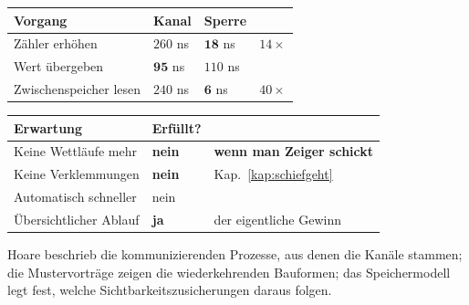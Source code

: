 \begin{aufgabe}
\begin{center}
\renewcommand{\arraystretch}{1.45}
\begin{tabular}{@{}P{3.4cm}P{2.0cm}P{2.0cm}P{1.6cm}@{}}
\toprule
\textbf{Vorgang} & \textbf{Kanal} & \textbf{Sperre} & \\
\midrule
Zähler erhöhen & $260$ ns & $\mathbf{18}$ ns & $14\times$\\
Wert übergeben & $\mathbf{95}$ ns & $110$ ns & \\
Zwischenspeicher lesen & $240$ ns & $\mathbf{6}$ ns & $40\times$\\
\bottomrule
\end{tabular}
\end{center}

\begin{center}
\end{center}

\begin{warnung}
\begin{center}
\renewcommand{\arraystretch}{1.5}
\begin{tabular}{@{}P{3.0cm}P{2.2cm}P{2.8cm}@{}}
\toprule
\textbf{Erwartung} & \textbf{Erfüllt?} & \\
\midrule
Keine Wettläufe mehr & \textcolor{akzent}{\textbf{nein}} & \textbf{wenn man Zeiger schickt}\\
Keine Verklemmungen & \textcolor{akzent}{\textbf{nein}} & \textcolor{akzent}{Kap.~\ref{kap:schiefgeht}}\\
Automatisch schneller & \textcolor{akzent}{nein} & \\
Übersichtlicher Ablauf & \textcolor{gruen}{\textbf{ja}} & \textcolor{gruen}{der eigentliche Gewinn}\\
\bottomrule
\end{tabular}
\end{center}

\begin{center}
\begin{minipage}{0.88\textwidth}
\end{minipage}
\end{center}
\end{warnung}
\end{aufgabe}
\vspace{-4pt}
\noindent Hoare beschrieb die kommunizierenden Prozesse, aus denen die Kanäle stammen; die Mus\-ter\-vor\-trä\-ge zeigen die wiederkehrenden Bau\-for\-men; das Speichermodell legt fest, welche Sicht\-bar\-keits\-zu\-si\-che\-run\-gen daraus folgen.
